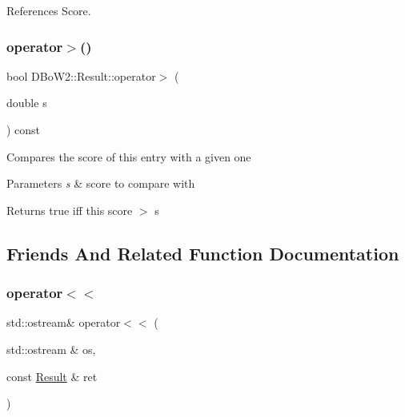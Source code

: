 References Score.

\mbox{\label{classDBoW2_1_1Result_a8618ccee54d229acc47a419b1262f08f}} 
\subsubsection{\texorpdfstring{operator$>$()}{operator>()}\hspace{0.1cm}{\footnotesize\ttfamily [2/2]}}
{\footnotesize\ttfamily bool D\+Bo\+W2\+::\+Result\+::operator$>$ (\begin{DoxyParamCaption}\item[{double}]{s }\end{DoxyParamCaption}) const\hspace{0.3cm}{\ttfamily [inline]}}

Compares the score of this entry with a given one 
\begin{DoxyParams}{Parameters}
{\em s} & score to compare with \\
\hline
\end{DoxyParams}
\begin{DoxyReturn}{Returns}
true iff this score $>$ s 
\end{DoxyReturn}


\subsection{Friends And Related Function Documentation}
\mbox{\label{classDBoW2_1_1Result_adcb074a444887749ca1ce08b25b73a48}} 
\subsubsection{\texorpdfstring{operator$<$$<$}{operator<<}}
{\footnotesize\ttfamily std\+::ostream\& operator$<$$<$ (\begin{DoxyParamCaption}\item[{std\+::ostream \&}]{os,  }\item[{const \hyperlink{classDBoW2_1_1Result}{Result} \&}]{ret }\end{DoxyParamCaption})\hspace{0.3cm}{\ttfamily [friend]}}


